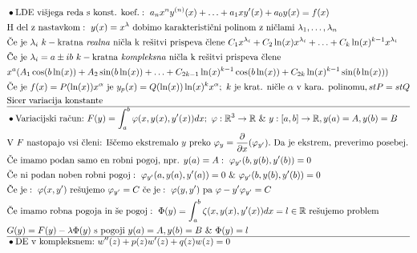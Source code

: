 \documentclass[a4paper, 8pt]{article}
\newcommand{\mth}[1]{\ensuremath{\mathbb{#1}}}
\newcommand{\R}{\mth{R}}
\newcommand{\map}[3]{\ensuremath{{#1}: {#2} \rightarrow {#3}}}
\begin{document}
	\begin{align*}
		& \bullet\text{LDE višjega reda s konst. koef.}:~a_nx^ny^{(n)}(x) + \ldots + a_1xy'(x) + a_0y(x) = f(x)\\
		& \text{H del z nastavkom}:~ y(x) = x^{\lambda}~\text{dobimo karakteristični polinom z ničlami}~\lambda_1, \ldots, \lambda_n\\
		& \text{Če je}~\lambda_i~k-\text{kratna \emph{realna} ničla k rešitvi prispeva člene}~ C_1x^{\lambda_i} + C_2\ln(x)x^{\lambda_i} + \ldots + C_k\ln(x)^{k-1}x^{\lambda_i} \\
		& \text{Če je}~\lambda_i = a\pm ib~k-\text{kratna \emph{kompleksna} ničla k rešitvi prispeva člene} \\ 
		&x^{a}(A_1\cos(b\ln(x)) + A_2\sin(b\ln(x)) + \ldots + C_{2k-1}\ln(x)^{k-1}\cos(b\ln(x))+ C_{2k}\ln(x)^{k-1}\sin(b\ln(x))) \\
		& \text{Če je}~f(x)=P(\ln(x))x^{\alpha}~\text{je}~y_p(x) = Q(\ln(x))\ln(x)^kx^\alpha;~k~\text{je krat. ničle}~\alpha~\text{v kara. polinomu}, stP = stQ\\
		& \text{Sicer variacija konstante} \\ \hline
		&\bullet\text{Variacijski račun:}~ F(y) = \int_{a}^{b}\varphi(x, y(x), y'(x))dx;~\map{\varphi}{\R^3}{\R}~\&~\map{y}{[a, b]}{\R}, y(a) = A, y(b)= B \\
		& \text{V}~F~\text{nastopajo vsi členi: Iščemo ekstremalo}~y~\text{preko} ~\varphi_y = \frac{\partial}{\partial x}(\varphi_{y'}).~\text{Da je ekstrem, preverimo posebej}. \\
		& \text{Če imamo podan samo en robni pogoj, npr. $y(a)=A$}:~ \varphi_{y'}(b, y(b), y'(b)) = 0 \\
		& \text{Če ni podan noben robni pogoj}:~\varphi_{y'}(a, y(a), y'(a)) = 0~\&~\varphi_{y'}(b, y(b), y'(b)) = 0 \\
		& \text{Če je}:~\varphi(x, y')~\text{rešujemo}~\varphi_{y'} = C~\text{če je}:~\varphi(y, y')~\text{pa}~\varphi - y'\varphi_{y'} = C \\
		& \text{Če imamo robna pogoja in še pogoj}:~\Phi(y) = \int_{a}^{b}\zeta(x, y(x), y'(x))dx = l\in\R~\text{rešujemo problem}\\
		&G(y) = F(y) - \lambda\Phi(y)~\text{s pogoji}~y(a) = A, y(b) = B~\&~\Phi(y) = l\\ \hline
		&\bullet\text{DE v kompleksnem:}~ w''(z) + p(z)w'(z) + q(z)w(z) = 0 \\

\end{align*}
\end{document}

